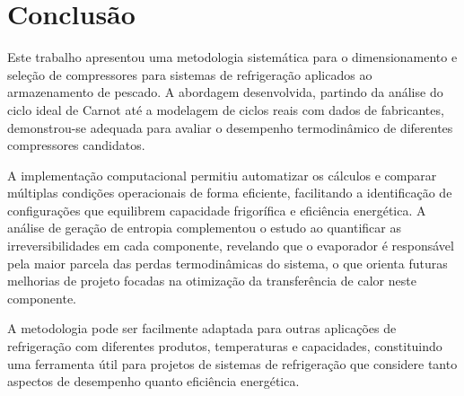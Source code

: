 \chapter{Conclusão}

Este trabalho apresentou uma metodologia sistemática para o dimensionamento e seleção de compressores para sistemas de refrigeração aplicados ao armazenamento de pescado. A abordagem desenvolvida, partindo da análise do ciclo ideal de Carnot até a modelagem de ciclos reais com dados de fabricantes, demonstrou-se adequada para avaliar o desempenho termodinâmico de diferentes compressores candidatos.

A implementação computacional permitiu automatizar os cálculos e comparar múltiplas condições operacionais de forma eficiente, facilitando a identificação de configurações que equilibrem capacidade frigorífica e eficiência energética. A análise de geração de entropia complementou o estudo ao quantificar as irreversibilidades em cada componente, revelando que o evaporador é responsável pela maior parcela das perdas termodinâmicas do sistema, o que orienta futuras melhorias de projeto focadas na otimização da transferência de calor neste componente.

A metodologia pode ser facilmente adaptada para outras aplicações de refrigeração com diferentes produtos, temperaturas e capacidades, constituindo uma ferramenta útil para projetos de sistemas de refrigeração que considere tanto aspectos de desempenho quanto eficiência energética.